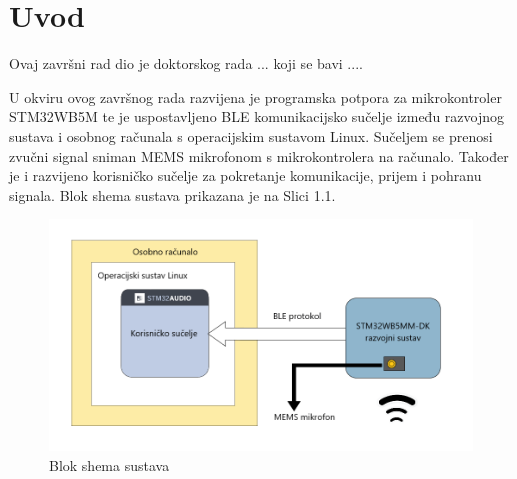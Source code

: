 \chapter{Uvod}


Ovaj završni rad dio je doktorskog rada ... koji se bavi .... 

U okviru ovog završnog rada razvijena je programska potpora za mikrokontroler STM32WB5M te je uspostavljeno BLE komunikacijsko sučelje između razvojnog sustava i osobnog računala s operacijskim sustavom Linux. Sučeljem se prenosi zvučni signal sniman MEMS mikrofonom s mikrokontrolera na računalo. Također je i razvijeno korisničko sučelje za pokretanje komunikacije, prijem i pohranu signala. Blok shema sustava prikazana je na Slici 1.1. 

\begin{figure}[ht]
	\includegraphics[width=\linewidth]{imgs/shema}
	\caption{Blok shema sustava}
	 \label{fig:shema}
\end{figure}

\eject
